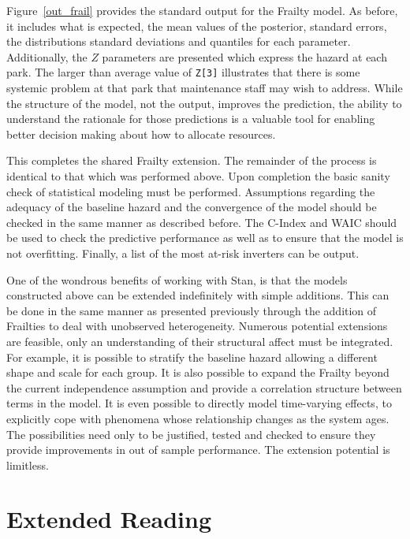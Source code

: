 Figure~\ref{out_frail} provides the standard output for the Frailty model. As before, it includes what is expected, the mean values of the posterior, standard errors, the distributions standard deviations and quantiles for each parameter. Additionally, the $Z$ parameters are presented which express the hazard at each park. The larger than average value of \lstinline{Z[3]} illustrates that there is some systemic problem at that park that maintenance staff may wish to address. While the structure of the model, not the output, improves the prediction, the ability to understand the rationale for those predictions is a valuable tool for enabling better decision making about how to allocate resources.

This completes the shared Frailty extension. The remainder of the process is identical to that which was performed above. Upon completion the basic sanity check of statistical modeling must be performed. Assumptions regarding the adequacy of the baseline hazard and the convergence of the model should be checked in the same manner as described before. The C-Index and WAIC should be used to check the predictive performance as well as to ensure that the model is not overfitting. Finally, a list of the most at-risk inverters can be output.

One of the wondrous benefits of working with Stan, is that the models constructed above can be extended indefinitely with simple additions. This can be done in the same manner as presented previously through the addition of Frailties to deal with unobserved heterogeneity. Numerous potential extensions are feasible, only an understanding of their structural affect must be integrated. For example, it is possible to stratify the baseline hazard allowing a different shape and scale for each group. It is also possible to expand the Frailty beyond the current independence assumption and provide a correlation structure between terms in the model. It is even possible to directly model time-varying effects, to explicitly cope with phenomena whose relationship changes as the system ages. The possibilities need only to be justified, tested and checked to ensure they provide improvements in out of sample performance. The extension potential is limitless. 






\section*{Extended Reading}


